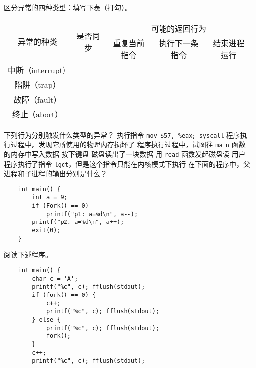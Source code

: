     \begin{problems}
        \pro 区分异常的四种类型：填写下表（打勾）。
        \begin{table}[H]
            \centering
            \begin{tabular}{|c|c|ccc|}
                \hline
                \multirow{2}{*}{异常的种类} & \multirow{2}{*}{是否同步} & \multicolumn{3}{c|}{可能的返回行为} \\ \cline{3-5} 
                &  & \multicolumn{1}{c|}{重复当前指令} & \multicolumn{1}{c|}{执行下一条指令} & 结束进程运行 \\ \hline
                中断（interrupt） & \rule{0pt}{3ex} & \multicolumn{1}{c|}{} & \multicolumn{1}{c|}{} &  \\ \hline
                陷阱（trap） & \rule{0pt}{3ex} & \multicolumn{1}{c|}{} & \multicolumn{1}{c|}{} &  \\ \hline
                故障（fault） & \rule{0pt}{3ex} & \multicolumn{1}{c|}{} & \multicolumn{1}{c|}{} &  \\ \hline
                终止（abort） & \rule{0pt}{3ex} & \multicolumn{1}{c|}{} & \multicolumn{1}{c|}{} &  \\ \hline
            \end{tabular}
        \end{table}
        \pro 下列行为分别触发什么类型的异常？
            \qn 执行指令 \verb|mov $57, %eax; syscall|
            \qn 程序执行过程中，发现它所使用的物理内存损坏了
            \qn 程序执行过程中，试图往 \verb|main| 函数的内存中写入数据
            \qn 按下键盘
            \qn 磁盘读出了一块数据
            \qn 用 \verb|read| 函数发起磁盘读
            \qn 用户程序执行了指令 \verb|lgdt|，但是这个指令只能在内核模式下执行
        \pro 在下面的程序中，父进程和子进程的输出分别是什么？
        \begin{verbatim}
    int main() {
        int a = 9;
        if (Fork() == 0)
            printf("p1: a=%d\n", a--);
        printf("p2: a=%d\n", a++);
        exit(0);
    }
        \end{verbatim}
        \pro 阅读下述程序。
        \begin{verbatim}
    int main() {
        char c = 'A';
        printf("%c", c); fflush(stdout);
        if (fork() == 0) {
            c++;
            printf("%c", c); fflush(stdout);
        } else {
            printf("%c", c); fflush(stdout);
            fork();
        }
        c++;
        printf("%c", c); fflush(stdout);

\end{verbatim}
\end{problems}
